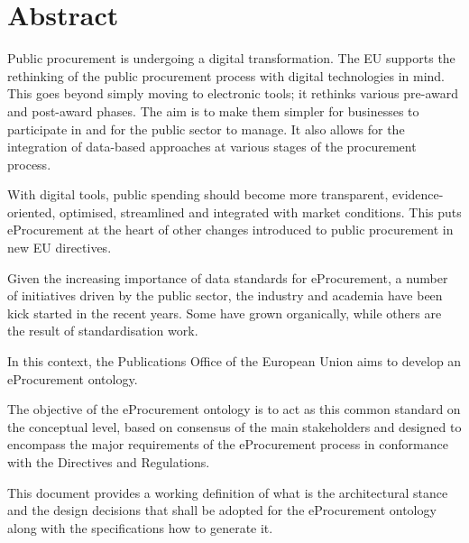 \section*{Abstract}
	Public procurement is undergoing a digital transformation. The EU supports the rethinking of the public procurement process with digital technologies in mind. This goes beyond simply moving to electronic tools; it rethinks various pre-award and post-award phases. The aim is to make them simpler for businesses to participate in and for the public sector to manage. It also allows for the integration of data-based approaches at various stages of the procurement process.
	
	With digital tools, public spending should become more transparent, evidence-oriented, optimised, streamlined and integrated with market conditions. This puts eProcurement at the heart of other changes introduced to public procurement in new EU directives.
	
	Given the increasing importance of data standards for eProcurement, a number of initiatives driven by the public sector, the industry and academia have been kick started	in the recent years. Some have grown organically, while others are the result of	standardisation work.
	
	In this context, the Publications Office of the European Union aims to develop an eProcurement ontology.
	
	The objective of the eProcurement ontology is to act as this common standard on the	conceptual level, based on consensus of the main stakeholders and designed to encompass the major requirements of the eProcurement process in conformance with the Directives and Regulations.
	
	This document provides a working definition of what is the architectural stance and the design decisions that shall be adopted for the eProcurement ontology along with the specifications how to generate it. 